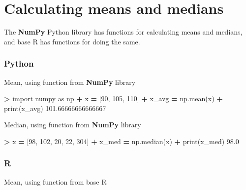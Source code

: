 \documentclass[
]{book}
\newenvironment{Shaded}{\begin{snugshade}}{\end{snugshade}}
\newcommand{\BuiltInTok}[1]{#1}
\newcommand{\DecValTok}[1]{\textcolor[rgb]{0.00,0.00,0.81}{#1}}
\newcommand{\FloatTok}[1]{\textcolor[rgb]{0.00,0.00,0.81}{#1}}
\newcommand{\ImportTok}[1]{#1}
\newcommand{\NormalTok}[1]{#1}
\newcommand{\OperatorTok}[1]{\textcolor[rgb]{0.81,0.36,0.00}{\textbf{#1}}}
\begin{document}
\hypertarget{calculating-means-and-medians}{%
\section{Calculating means and medians}\label{calculating-means-and-medians}}

The \textbf{NumPy} Python library has functions for calculating means and medians, and base R has functions for doing the same.

\hypertarget{python-6}{%
\subsubsection*{Python}\label{python-6}}

Mean, using function from \textbf{NumPy} library

\begin{Shaded}
\begin{Highlighting}[]
\OperatorTok{\textgreater{}} \ImportTok{import}\NormalTok{ numpy }\ImportTok{as}\NormalTok{ np}
\OperatorTok{+}\NormalTok{ x }\OperatorTok{=}\NormalTok{ [}\DecValTok{90}\NormalTok{, }\DecValTok{105}\NormalTok{, }\DecValTok{110}\NormalTok{]}
\OperatorTok{+}\NormalTok{ x\_avg }\OperatorTok{=}\NormalTok{ np.mean(x)}
\OperatorTok{+} \BuiltInTok{print}\NormalTok{(x\_avg)}
\FloatTok{101.66666666666667}
\end{Highlighting}
\end{Shaded}

Median, using function from \textbf{NumPy} library

\begin{Shaded}
\begin{Highlighting}[]
\OperatorTok{\textgreater{}}\NormalTok{ x }\OperatorTok{=}\NormalTok{ [}\DecValTok{98}\NormalTok{, }\DecValTok{102}\NormalTok{, }\DecValTok{20}\NormalTok{, }\DecValTok{22}\NormalTok{, }\DecValTok{304}\NormalTok{]}
\OperatorTok{+}\NormalTok{ x\_med }\OperatorTok{=}\NormalTok{ np.median(x)}
\OperatorTok{+} \BuiltInTok{print}\NormalTok{(x\_med)}
\FloatTok{98.0}
\end{Highlighting}
\end{Shaded}

\hypertarget{r-6}{%
\subsubsection*{R}\label{r-6}}

Mean, using function from base R
\end{document}
